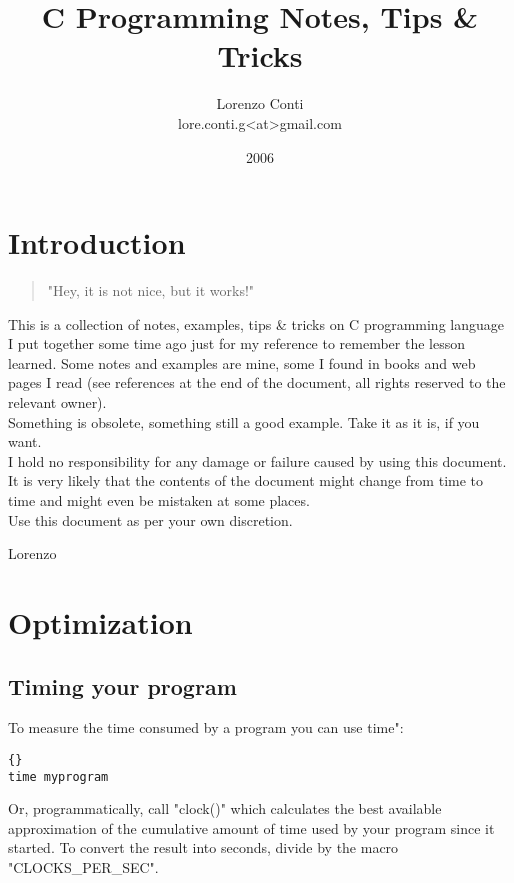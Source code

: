 \documentclass{report}
\begin{document}
\title{C Programming Notes, Tips \& Tricks}
\author{Lorenzo Conti \\ lore.conti.g<at>gmail.com } 
\date{2006}

\maketitle
\tableofcontents


\chapter{Introduction}

\begin{quote}
"Hey, it is not nice, but it works!"
\end{quote}

This is a collection of notes, examples, tips \& tricks on C programming language I put together some time ago just for my reference to remember the lesson learned.
Some notes and examples are mine, some I found in books and web pages I read (see references at the end of the document, all rights reserved to the relevant owner). \\
Something is obsolete, something still a good example. Take it as it is, if you want. \\
I hold no responsibility for any damage or failure caused by using this document. It is very likely that the contents of the document might change from time to time and might even be mistaken at some places. \\
Use this document as per your own discretion.

\hfill Lorenzo

\chapter{Optimization}

\section{Timing your program}
To measure the time consumed by a program you can use time":
\begin{lstlisting}{}
time myprogram
\end{lstlisting}
Or, programmatically, call "clock()" which calculates the best available approximation of the cumulative amount of time used by your program since it started. To convert the result into seconds, divide by the macro "CLOCKS\_PER\_SEC".
\end{document}
